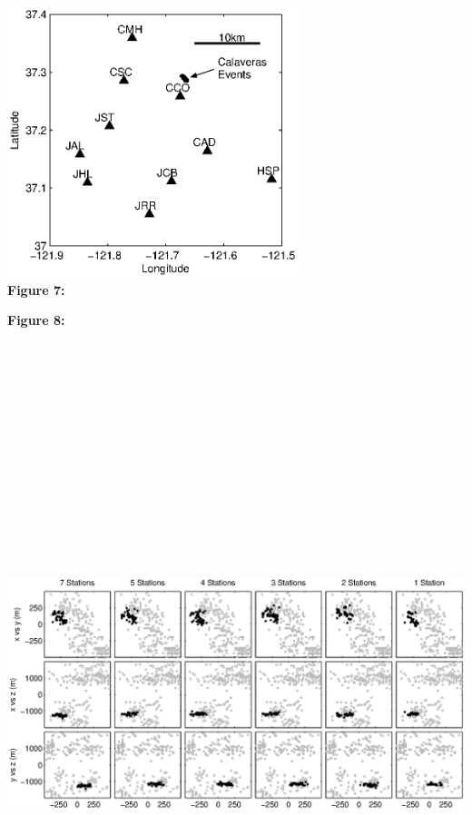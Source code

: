 \documentclass[12pt,double]{article}
\begin{document}

\clearpage
\noindent\includegraphics[width=20pc]{Figure7.eps} \\
\textbf{Figure 7:} 


\textbf{Figure 8:} \noindent\includegraphics[angle=90,height = 50pc]{Figure8_bw.eps} \\
\end{document}
